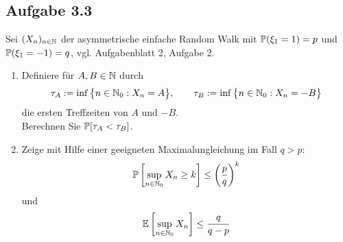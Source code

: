 \subsection{Aufgabe 3.3}
Sei $(X_n)_{n\in\N}$ der asymmetrische einfache Random Walk mit $\P(\xi_1=1)=p$ und $\P(\xi_1=-1)=q$, vgl. Aufgabenblatt 2, Aufgabe 2.
\begin{enumerate}[label=\alph*)]
	\item Definiere für $A,B\in\N$ durch
	\begin{align*}
		\tau_A:=\inf\big\lbrace n\in\N_0:X_n=A\big\rbrace,\qquad \tau_B:=\inf\limits\big\lbrace n\in\N_0:X_n=-B\big\rbrace
	\end{align*}
	die ersten Treffzeiten von $A$ und $-B$.\\
	Berechnen Sie $\P[\tau_A<\tau_B]$.
	\item Zeige mit Hilfe einer geeigneten Maximalungleichung im Fall $q>p$:
	\begin{align}\label{eqAufgabe3bObere}
		\P\left[\sup\limits_{n\in\N_0} X_n\geq k\right]\leq\left(\frac{p}{q}\right)^k
	\end{align}
	und 
	\begin{align}\label{eqAufgabe3bUntere}
		\E\left[\sup\limits_{n\in\N_0} X_n\right]\leq\frac{q}{q-p}
	\end{align}
\end{enumerate}


